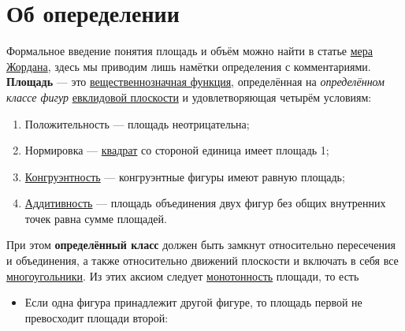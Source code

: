 \documentclass[a4paper,8pt,leqno]{article}
\theoremstyle{plain}
\theoremstyle{definition} %
\theoremstyle{remark} %
\begin{document}
	\section{Об опеределении}
	Формальное введение понятия площадь и объём можно найти в статье \href{https://ru.wikipedia.org/wiki/\%D0\%9C\%D0\%B5\%D1\%80\%D0\%B0\_\%D0\%96\%D0\%BE\%D1\%80\%D0\%B4\%D0\%B0\%D0\%BD\%D0\%B0}{мера Жордана}, здесь мы приводим лишь намётки определения с комментариями.
	\textbf{Площадь} — это \href{https://ru.wikipedia.org/wiki/\%D0\%92\%D0\%B5\%D1\%89\%D0\%B5\%D1\%81\%D1\%82\%D0\%B2\%D0\%B5\%D0\%BD\%D0\%BD\%D0\%BE\%D0\%B5\_\%D1\%87\%D0\%B8\%D1\%81\%D0\%BB\%D0\%BE}{вещественнозначная функция}, определённая на \textit{определённом классе фигур} \href{https://ru.wikipedia.org/wiki/\%D0\%95\%D0\%B2\%D0\%BA\%D0\%BB\%D0\%B8\%D0\%B4\%D0\%BE\%D0\%B2\%D0\%BE\_\%D0\%BF\%D1\%80\%D0\%BE\%D1\%81\%D1\%82\%D1\%80\%D0\%B0\%D0\%BD\%D1\%81\%D1\%82\%D0\%B2\%D0\%BE}{евклидовой плоскости} и удовлетворяющая четырём условиям:
	\begin{enumerate}
	\item Положительность — площадь неотрицательна;
	\item Нормировка — \href{https://ru.wikipedia.org/wiki/\%D0\%9A\%D0\%B2\%D0\%B0\%D0\%B4\%D1\%80\%D0\%B0\%D1\%82}{квадрат} со стороной единица имеет площадь 1;
	\item \href{https://ru.wikipedia.org/wiki/\%D0\%9A\%D0\%BE\%D0\%BD\%D0\%B3\%D1\%80\%D1\%83\%D1\%8D\%D0\%BD\%D1\%82\%D0\%BD\%D0\%BE\%D1\%81\%D1\%82\%D1\%8C\_(\%D0\%B3\%D0\%B5\%D0\%BE\%D0\%BC\%D0\%B5\%D1\%82\%D1\%80\%D0\%B8\%D1\%8F)}{Конгруэнтность} — конгруэнтные фигуры имеют равную площадь;
	\item \href{https://ru.wikipedia.org/wiki/\%D0\%90\%D0\%B4\%D0\%B4\%D0\%B8\%D1\%82\%D0\%B8\%D0\%B2\%D0\%BD\%D0\%BE\%D1\%81\%D1\%82\%D1\%8C}{Аддитивность} — площадь объединения двух фигур без общих внутренних точек равна сумме площадей.
	\end{enumerate}
При этом \textbf{определённый класс} должен быть замкнут относительно пересечения и объединения, а также относительно движений плоскости и включать в себя все \href{https://ru.wikipedia.org/wiki/\%D0\%9C\%D0\%BD\%D0\%BE\%D0\%B3\%D0\%BE\%D1\%83\%D0\%B3\%D0\%BE\%D0\%BB\%D1\%8C\%D0\%BD\%D0\%B8\%D0\%BA}{многоугольники}. Из этих аксиом следует \href{https://ru.wikipedia.org/wiki/\%D0\%9C\%D0\%BE\%D0\%BD\%D0\%BE\%D1\%82\%D0\%BE\%D0\%BD\%D0\%BD\%D0\%BE\%D1\%81\%D1\%82\%D1\%8C\_\%D1\%84\%D1\%83\%D0\%BD\%D0\%BA\%D1\%86\%D0\%B8\%D0\%B8}{монотонность} площади, то есть
\begin{itemize}
\item Если одна фигура принадлежит другой фигуре, то площадь первой не превосходит площади второй:
\end{itemize}
\end{document}
